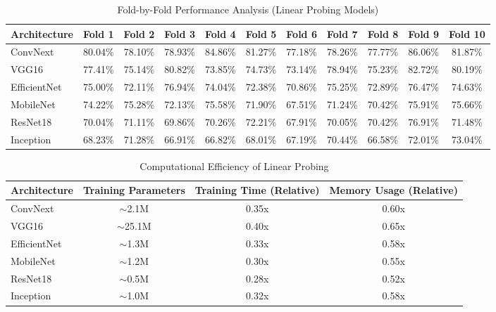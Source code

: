 \documentclass[11pt]{article}
\begin{document}
\begin{table}[ht]
    \centering
    \small
    \begin{tabular}{lcccccccccc}
    \toprule
    \textbf{Architecture} & \textbf{Fold 1} & \textbf{Fold 2} & \textbf{Fold 3} & \textbf{Fold 4} & \textbf{Fold 5} & \textbf{Fold 6} & \textbf{Fold 7} & \textbf{Fold 8} & \textbf{Fold 9} & \textbf{Fold 10} \\
    \midrule
    ConvNext & 80.04\% & 78.10\% & 78.93\% & 84.86\% & 81.27\% & 77.18\% & 78.26\% & 77.77\% & 86.06\% & 81.87\% \\
    VGG16 & 77.41\% & 75.14\% & 80.82\% & 73.85\% & 74.73\% & 73.14\% & 78.94\% & 75.23\% & 82.72\% & 80.19\% \\
    EfficientNet & 75.00\% & 72.11\% & 76.94\% & 74.04\% & 72.38\% & 70.86\% & 75.25\% & 72.89\% & 76.47\% & 74.63\% \\
    MobileNet & 74.22\% & 75.28\% & 72.13\% & 75.58\% & 71.90\% & 67.51\% & 71.24\% & 70.42\% & 75.91\% & 75.66\% \\
    ResNet18 & 70.04\% & 71.11\% & 69.86\% & 70.26\% & 72.21\% & 67.91\% & 70.05\% & 70.42\% & 76.91\% & 71.48\% \\
    Inception & 68.23\% & 71.28\% & 66.91\% & 66.82\% & 68.01\% & 67.19\% & 70.44\% & 66.58\% & 72.01\% & 73.04\% \\
    \bottomrule
    \end{tabular}
    \caption{Fold-by-Fold Performance Analysis (Linear Probing Models)}
    \label{tab:fold_analysis_lp}
\end{table}
\begin{table}[ht]
    \centering
    \begin{tabular}{lccc}
    \toprule
    \textbf{Architecture} & \textbf{Training Parameters} & \textbf{Training Time (Relative)} & \textbf{Memory Usage (Relative)} \\
    \midrule
    ConvNext & $\sim$2.1M & 0.35x & 0.60x \\
    VGG16 & $\sim$25.1M & 0.40x & 0.65x \\
    EfficientNet & $\sim$1.3M & 0.33x & 0.58x \\
    MobileNet & $\sim$1.2M & 0.30x & 0.55x \\
    ResNet18 & $\sim$0.5M & 0.28x & 0.52x \\
    Inception & $\sim$1.0M & 0.32x & 0.58x \\
    \bottomrule
    \end{tabular}
    \caption{Computational Efficiency of Linear Probing\protect\footnotemark}
    \label{tab:computational_efficiency}
\end{table}
\end{document}
